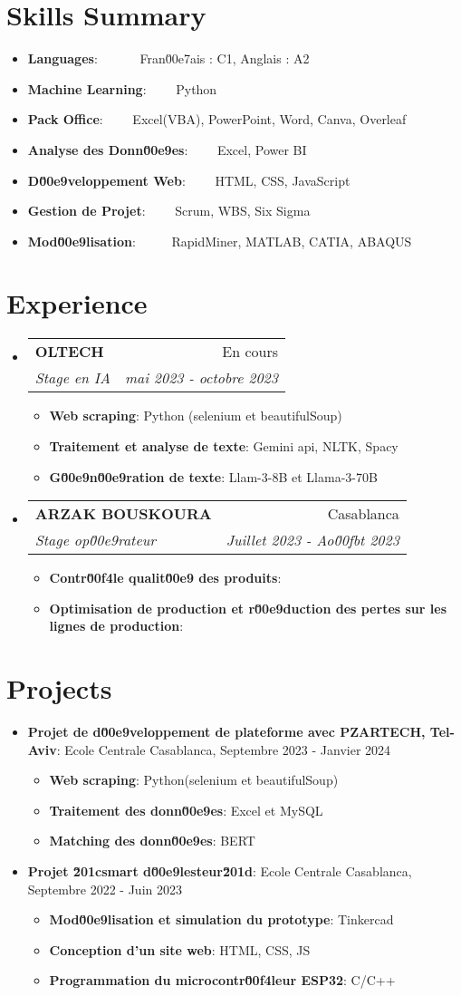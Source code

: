 \documentclass[a4paper,20pt]{article}
\makeatletter
\newcommand{\resumeItem}[2]{
  \item\small{
    \textbf{#1}{: #2 \vspace{-2pt}}
  }
}
\newcommand{\resumeSubheading}[4]{
  \vspace{-1pt}\item
    \begin{tabular*}{0.97\textwidth}{l@{\extracolsep{\fill}}r}
      \textbf{#1} & #2 \\
      \textit{#3} & \textit{#4} \\
    \end{tabular*}\vspace{-5pt}
}
\newcommand{\resumeSubItem}[2]{\resumeItem{#1}{#2}\vspace{-3pt}}
\newcommand{\resumeSubHeadingListStart}{\begin{itemize}[leftmargin=*]}
\newcommand{\resumeSubHeadingListEnd}{\end{itemize}}
\newcommand{\resumeItemListStart}{\begin{itemize}}
\newcommand{\resumeItemListEnd}{\end{itemize}\vspace{-5pt}}
\makeatother
\begin{document}
\begin{multicols}{2}

\vspace{-5pt}
\section{Skills Summary}
	\resumeSubHeadingListStart
	\resumeSubItem{Languages}{~~~~~~Fran\u00e7ais : C1, Anglais : A2}
	\resumeSubItem{Machine Learning}{~~~~Python}
	\resumeSubItem{Pack Office}{~~~~Excel(VBA), PowerPoint, Word, Canva, Overleaf}
	\resumeSubItem{Analyse des Donn\u00e9es}{~~~~Excel, Power BI}
	\resumeSubItem{D\u00e9veloppement Web}{~~~~HTML, CSS, JavaScript}
	\resumeSubItem{Gestion de Projet}{~~~~Scrum, WBS, Six Sigma}
	\resumeSubItem{Mod\u00e9lisation}{~~~~~RapidMiner, MATLAB, CATIA, ABAQUS}
	\resumeSubHeadingListEnd

\vspace{-5pt}
\section{Experience}
  \resumeSubHeadingListStart
      \resumeSubheading
      {OLTECH}{En cours}
      {Stage en IA}{mai 2023 - octobre 2023}
      \resumeItemListStart
        \resumeItem{Web scraping}{Python (selenium et beautifulSoup)}
        \resumeItem{Traitement et analyse de texte}{Gemini api, NLTK, Spacy}
        \resumeItem{G\u00e9n\u00e9ration de texte}{Llam-3-8B et Llama-3-70B}
      \resumeItemListEnd
\vspace{-5pt}
      \resumeSubheading
      {ARZAK BOUSKOURA}{Casablanca}
      {Stage op\u00e9rateur}{Juillet 2023 - Ao\u00fbt 2023}
      \resumeItemListStart
        \resumeItem{Contr\u00f4le qualit\u00e9 des produits}{}
        \resumeItem{Optimisation de production et r\u00e9duction des pertes sur les lignes de production}{}
      \resumeItemListEnd
  \resumeSubHeadingListEnd

\vspace{-5pt}
\section{Projects}
\resumeSubHeadingListStart
\resumeSubItem{Projet de d\u00e9veloppement de plateforme avec PZARTECH, Tel-Aviv}{Ecole Centrale Casablanca, Septembre 2023 - Janvier 2024}
    \resumeItemListStart
        \resumeItem{Web scraping}{Python(selenium et beautifulSoup)}
        \resumeItem{Traitement des donn\u00e9es}{Excel et MySQL}
        \resumeItem{Matching des donn\u00e9es}{BERT}
    \resumeItemListEnd
\vspace{2pt}
\resumeSubItem{Projet \u201csmart d\u00e9lesteur\u201d}{Ecole Centrale Casablanca, Septembre 2022 - Juin 2023}
    \resumeItemListStart
        \resumeItem{Mod\u00e9lisation et simulation du prototype}{Tinkercad}
        \resumeItem{Conception d'un site web}{HTML, CSS, JS}
        \resumeItem{Programmation du microcontr\u00f4leur ESP32}{C/C++}
    \resumeItemListEnd
\resumeSubHeadingListEnd


\end{multicols}
\end{document}
